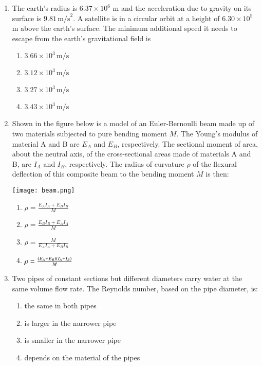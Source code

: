 \documentclass[journal]{IEEEtran}
\theoremstyle{remark}
\begin{document}
\begin{enumerate}[start=18]
\item  The earth's radius is $6.37 \times 10^6$ m and the acceleration due to gravity on its surface is $9.81 \, \text{m/s}^2$. A satellite is in a circular orbit at a height of $6.30 \times 10^5$ m above the earth's surface. The minimum additional speed it needs to escape from the earth's gravitational field is
\begin{multicols}{2}
\begin{enumerate}
\item $3.66 \times 10^3 \, \text{m/s}$
\item $3.12 \times 10^3 \, \text{m/s}$
\item $3.27 \times 10^3 \, \text{m/s}$
\item $3.43 \times 10^3 \, \text{m/s}$
\end{enumerate}
\end{multicols}

\item  Shown in the figure below is a model of an Euler-Bernoulli beam made up of two materials subjected to pure bending moment $M$. The Young's modulus of material A and B are $E_A$ and $E_B$, respectively. The sectional moment of area, about the neutral axis, of the cross-sectional areas made of materials A and B, are $I_A$ and $I_B$, respectively. The radius of curvature $\rho$ of the flexural deflection of this composite beam to the bending moment $M$ is then:
\begin{center}
    \texttt{[image: beam.png]}
\end{center}


\begin{multicols}{4}
\begin{enumerate}
\item $\rho = \frac{E_A I_A + E_B I_B}{M}$
\item $\rho = \frac{E_B I_B + E_A I_A}{M}$
\item $\rho = \frac{M}{E_A I_A + E_B I_B}$
\item $\rho = \frac{\left(E_A + E_B\right)\left(I_A + I_B\right)}{M}$
\end{enumerate}
\end{multicols}

\item  Two pipes of constant sections but different diameters carry water at the same volume flow rate. The Reynolds number, based on the pipe diameter, is:
\begin{multicols}{2}
\begin{enumerate}
\item the same in both pipes
\item is larger in the narrower pipe
\item is smaller in the narrower pipe
\item depends on the material of the pipes
\end{enumerate}
\end{multicols}


\end{enumerate}
\end{document}
